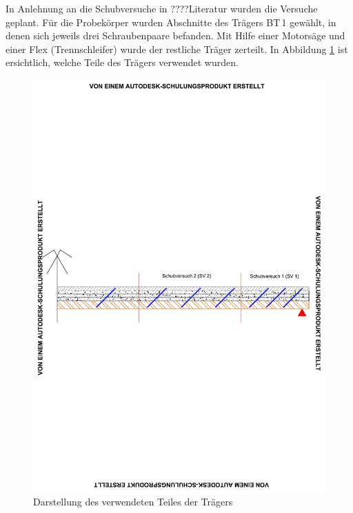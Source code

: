 In Anlehnung an die Schubversuche in ????Literatur wurden die Versuche geplant. Für die Probekörper wurden Abschnitte des Trägers BT\,1 gewählt, in denen sich jeweils drei Schraubenpaare befanden. Mit Hilfe einer Motorsäge und einer Flex (Trennschleifer) wurde der restliche Träger zerteilt.
In Abbildung \ref{träger_scherversuch} ist ersichtlich, welche Teile des Trägers verwendet wurden. 



\begin{figure}[h]
\begin{center}
\includegraphics[scale =0.8,trim= 1cm 12cm 1cm 12cm, clip=true]{Auswertung/schubversuch/Teile_Schubversuch.pdf}
\caption{Darstellung des verwendeten Teiles der Trägers}
\label{träger_scherversuch}
\end{center}
\end{figure}



